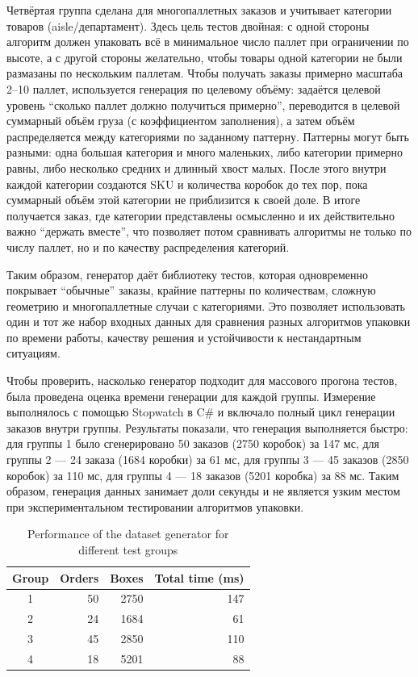 Четвёртая группа сделана для многопаллетных заказов и учитывает категории товаров (aisle/департамент). Здесь цель тестов двойная: с одной стороны алгоритм должен упаковать всё в минимальное число паллет при ограничении по высоте, а с другой стороны желательно, чтобы товары одной категории не были размазаны по нескольким паллетам. Чтобы получать заказы примерно масштаба 2–10 паллет, используется генерация по целевому объёму: задаётся целевой уровень “сколько паллет должно получиться примерно”, переводится в целевой суммарный объём груза (с коэффициентом заполнения), а затем объём распределяется между категориями по заданному паттерну. Паттерны могут быть разными: одна большая категория и много маленьких, либо категории примерно равны, либо несколько средних и длинный хвост малых. После этого внутри каждой категории создаются SKU и количества коробок до тех пор, пока суммарный объём этой категории не приблизится к своей доле. В итоге получается заказ, где категории представлены осмысленно и их действительно важно “держать вместе”, что позволяет потом сравнивать алгоритмы не только по числу паллет, но и по качеству распределения категорий.

Таким образом, генератор даёт библиотеку тестов, которая одновременно покрывает “обычные” заказы, крайние паттерны по количествам, сложную геометрию и многопаллетные случаи с категориями. Это позволяет использовать один и тот же набор входных данных для сравнения разных алгоритмов упаковки по времени работы, качеству решения и устойчивости к нестандартным ситуациям.

Чтобы проверить, насколько генератор подходит для массового прогона тестов, была проведена оценка времени генерации для каждой группы. Измерение выполнялось с помощью Stopwatch в C\# и включало полный цикл генерации заказов внутри группы. Результаты показали, что генерация выполняется быстро: для группы 1 было сгенерировано 50 заказов (2750 коробок) за 147 мс, для группы 2 — 24 заказа (1684 коробки) за 61 мс, для группы 3 — 45 заказов (2850 коробок) за 110 мс, для группы 4 — 18 заказов (5201 коробка) за 88 мс. Таким образом, генерация данных занимает доли секунды и не является узким местом при экспериментальном тестировании алгоритмов упаковки.

\begin{table}[h]
\centering
\caption{Performance of the dataset generator for different test groups}
\label{tab:gen_perf}
\begin{tabular}{|c|r|r|r|}
\hline
\textbf{Group} & \textbf{Orders} & \textbf{Boxes} & \textbf{Total time (ms)} \\
\hline
1 & 50 & 2750 & 147 \\
\hline
2 & 24 & 1684 & 61 \\
\hline
3 & 45 & 2850 & 110 \\
\hline
4 & 18 & 5201 & 88 \\
\hline
\end{tabular}
\end{table}

